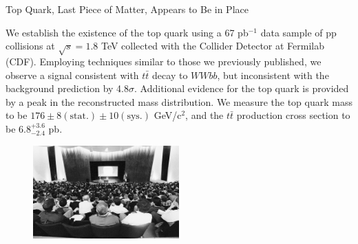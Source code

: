 \begin{MyArticle}[enhanced, tikz={rotate=0}]{Top Quark, Last Piece of Matter, Appears to Be in Place}
  \begin{multicols}{2}
    We establish the existence of the top quark using a 67 pb$^{-1}$ data
    sample of pp collisions at $\sqrt{s} = 1.8$ TeV collected with the Collider
    Detector at Fermilab (CDF). Employing techniques similar to those we
    previously published, we observe a signal consistent with $t\bar{t}$ decay to
    $WWbb$, but inconsistent with the background prediction by
    4.8$\sigma$. Additional evidence for the top quark is provided by a peak in
    the reconstructed mass distribution. We measure the top quark mass
    to be $176 \pm 8 (\text{stat.}) \pm 10 (\text{sys.})$ GeV/c$^{2}$,
    and the $t\bar{t}$ production cross section to be
    $6.8^{+3.6}_{-2.4}$ pb.
    \begin{figure}
      \begin{center}
        \vspace{-0.2in}
        \leavevmode
        \includegraphics[width=0.5\textwidth]{./figures/TopQuarkAnnouncement.jpg}
      \end{center}
    \end{figure}
  \end{multicols}
\end{MyArticle}
